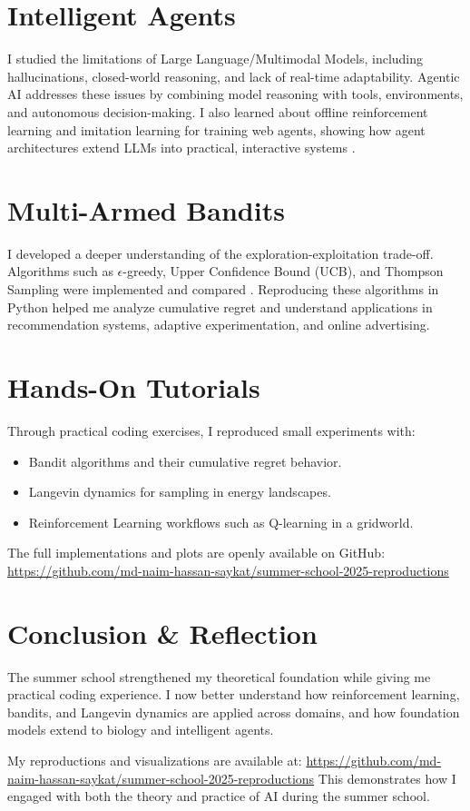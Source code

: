 \documentclass[11pt,a4paper]{article}
\begin{document}
\section{Intelligent Agents}
I studied the limitations of Large Language/Multimodal Models, including hallucinations, closed-world reasoning, and lack of real-time adaptability.  
Agentic AI addresses these issues by combining model reasoning with tools, environments, and autonomous decision-making.  
I also learned about offline reinforcement learning and imitation learning for training web agents, showing how agent architectures extend LLMs into practical, interactive systems \cite{wang2023agents}.

\section{Multi-Armed Bandits}
I developed a deeper understanding of the exploration-exploitation trade-off.  
Algorithms such as $\epsilon$-greedy, Upper Confidence Bound (UCB), and Thompson Sampling were implemented and compared \cite{lattimore2020bandit}.  
Reproducing these algorithms in Python helped me analyze cumulative regret and understand applications in recommendation systems, adaptive experimentation, and online advertising.

\section{Hands-On Tutorials}
Through practical coding exercises, I reproduced small experiments with:
\begin{itemize}
    \item Bandit algorithms and their cumulative regret behavior.  
    \item Langevin dynamics for sampling in energy landscapes.  
    \item Reinforcement Learning workflows such as Q-learning in a gridworld.  
\end{itemize}
The full implementations and plots are openly available on GitHub:  
\url{https://github.com/md-naim-hassan-saykat/summer-school-2025-reproductions}

\section{Conclusion \& Reflection}
The summer school strengthened my theoretical foundation while giving me practical coding experience.  
I now better understand how reinforcement learning, bandits, and Langevin dynamics are applied across domains, and how foundation models extend to biology and intelligent agents.  
\par My reproductions and visualizations are available at:  
\url{https://github.com/md-naim-hassan-saykat/summer-school-2025-reproductions}  
This demonstrates how I engaged with both the theory and practice of AI during the summer school.
\end{document}
